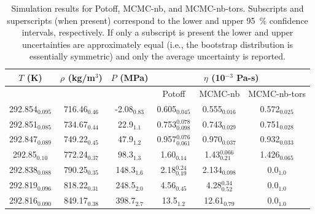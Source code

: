 \documentclass[preprint,review,12pt]{elsarticle}
\begin{document}
	\begin{table}[htb!]
		\caption{Simulation results for Potoff, MCMC-nb, and MCMC-nb-tors. Subscripts and superscripts (when present) correspond to the lower and upper 95~\% confidence intervals, respectively. If only a subscript is present the lower and upper uncertainties are approximately equal (i.e., the bootstrap distribution is essentially symmetric) and only the average uncertainty is reported.} \label{tab:tabulated_values}
		\begin{center}
			\begin{tabular}{|c|c|c|c|c|c|}
				\hline
				\multicolumn{1}{|c}{$T$ (K)} & \multicolumn{1}{|c}{$\rho$ (kg/m$^3$)} & \multicolumn{1}{|c}{$P$ (MPa)} & \multicolumn{3}{|c|}{$\eta$ (10$^{-3}$ Pa-s)} \\ \hline
				 &  &  & Potoff & MCMC-nb & MCMC-nb-tors \\ \hline 
				292.854$_{0.095}$ & 	716.46$_{0.46}$ & 	-2.08$_{0.83}$ & 	0.605$_{0.045}$ & 	0.555$_{0.016}$ & 	0.572$_{0.025}$ \\
				292.851$_{0.085}$ & 	734.67$_{0.44}$ & 	22.9$_{1.1}$ & 	0.753$^{0.078}_{0.098}$ & 	0.743$_{0.029}$ & 	0.751$_{0.028}$ \\
				292.847$_{0.089}$ & 	749.22$_{0.45}$ & 	47.9$_{1.2}$ & 	0.957$^{0.076}_{0.061}$ & 	0.970$_{0.037}$ & 	0.932$_{0.033}$ \\
				292.85$_{0.10}$ & 	772.24$_{0.37}$ & 	98.3$_{1.3}$ & 	1.60$_{0.14}$ & 	1.43$^{0.066}_{0.21}$ & 	1.426$_{0.065}$ \\
				292.838$_{0.088}$ & 	790.25$_{0.35}$ & 	148.3$_{1.6}$ & 	2.18$^{0.24}_{0.19}$ & 	2.134$_{0.098}$ & 	0.0$_{1.0}$ \\
				292.819$_{0.096}$ & 	818.22$_{0.31}$ & 	248.5$_{2.0}$ & 	4.56$_{0.45}$ & 	4.28$^{0.34}_{0.52}$ & 	0.0$_{1.0}$ \\
				292.816$_{0.090}$ & 	849.17$_{0.38}$ & 	398.7$_{2.7}$ & 	13.5$_{1.2}$ & 	12.61$_{0.79}$ & 	0.0$_{1.0}$ \\

\end{tabular}
\end{center}
\end{table}
\end{document}
